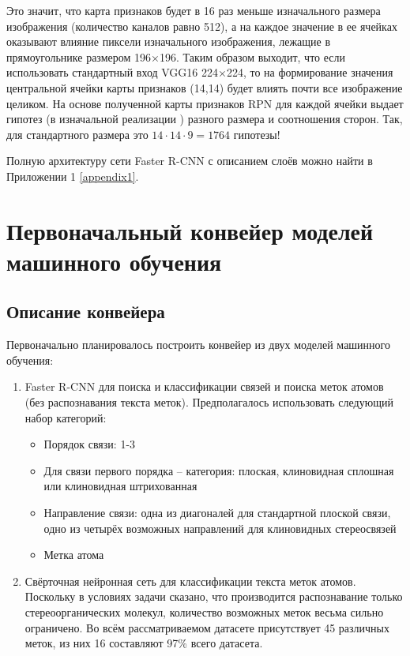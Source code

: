 Это значит, что карта признаков будет в 16 раз меньше изначального размера изображения (количество каналов равно 512), а на каждое значение в ее ячейках оказывают влияние пиксели изначального изображения, лежащие в прямоугольнике размером 196×196. Таким образом выходит, что если использовать стандартный вход VGG16 224×224, то на формирование значения центральной ячейки карты признаков (14,14) будет влиять почти все изображение целиком. На основе полученной карты признаков RPN для каждой ячейки выдает гипотез (в изначальной реализации ) разного размера и соотношения сторон. Так, для стандартного размера это $14 \cdot 14 \cdot 9 = 1764$ гипотезы!

Полную архитектуру сети Faster R-CNN с описанием слоёв можно найти в Приложении 1 \ref{appendix1}.

\section{Первоначальный конвейер моделей машинного обучения} \label{ch2:sec2}

\subsection{Описание конвейера}
Первоначально планировалось построить конвейер из двух моделей машинного обучения:
\begin{enumerate}[1.]
	\item Faster R-CNN для поиска и классификации связей и поиска меток атомов (без распознавания текста меток). Предполагалось использовать следующий набор категорий:
	\begin{itemize}
		\item Порядок связи: 1-3
		\item Для связи первого порядка -- категория: плоская, клиновидная сплошная или клиновидная штрихованная
		\item Направление связи: одна из диагоналей для стандартной плоской связи, одно из четырёх возможных направлений для клиновидных стереосвязей
		\item Метка атома
	\end{itemize}
    \item Свёрточная нейронная сеть для классификации текста меток атомов. Поскольку в условиях задачи сказано, что производится распознавание только стереоорганических молекул, количество возможных меток весьма сильно ограничено. Во всём рассматриваемом датасете присутствует 45 различных меток, из них 16 составляют 97\% всего датасета.
\end{enumerate}

